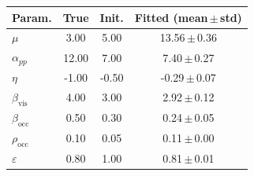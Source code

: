 \begin{tabular}{@{}lccc@{}}
\toprule
Param. & True & Init. & Fitted (mean\,$\pm$\,std) \\
\midrule
$\mu$ & 3.00 & 5.00 & 13.56\,$\pm$\,0.36 \\
$\alpha_{pp}$ & 12.00 & 7.00 & 7.40\,$\pm$\,0.27 \\
$\eta$ & -1.00 & -0.50 & -0.29\,$\pm$\,0.07 \\
$\beta_{\mathrm{vis}}$ & 4.00 & 3.00 & 2.92\,$\pm$\,0.12 \\
$\beta_{\mathrm{occ}}$ & 0.50 & 0.30 & 0.24\,$\pm$\,0.05 \\
$\rho_{\mathrm{occ}}$ & 0.10 & 0.05 & 0.11\,$\pm$\,0.00 \\
$\varepsilon$ & 0.80 & 1.00 & 0.81\,$\pm$\,0.01 \\
\bottomrule
\end{tabular}
